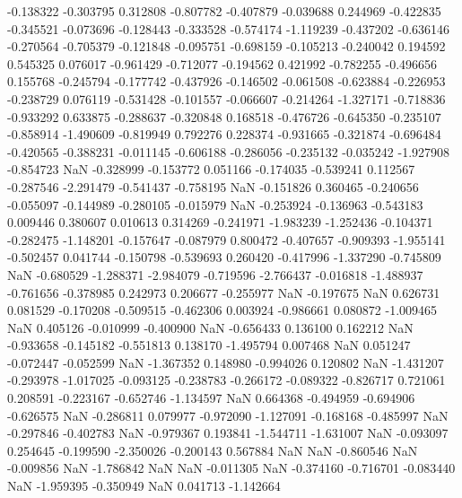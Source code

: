 -0.138322
-0.303795
0.312808
-0.807782
-0.407879
-0.039688
0.244969
-0.422835
-0.345521
-0.073696
-0.128443
-0.333528
-0.574174
-1.119239
-0.437202
-0.636146
-0.270564
-0.705379
-0.121848
-0.095751
-0.698159
-0.105213
-0.240042
0.194592
0.545325
0.076017
-0.961429
-0.712077
-0.194562
0.421992
-0.782255
-0.496656
0.155768
-0.245794
-0.177742
-0.437926
-0.146502
-0.061508
-0.623884
-0.226953
-0.238729
0.076119
-0.531428
-0.101557
-0.066607
-0.214264
-1.327171
-0.718836
-0.933292
0.633875
-0.288637
-0.320848
0.168518
-0.476726
-0.645350
-0.235107
-0.858914
-1.490609
-0.819949
0.792276
0.228374
-0.931665
-0.321874
-0.696484
-0.420565
-0.388231
-0.011145
-0.606188
-0.286056
-0.235132
-0.035242
-1.927908
-0.854723
NaN
-0.328999
-0.153772
0.051166
-0.174035
-0.539241
0.112567
-0.287546
-2.291479
-0.541437
-0.758195
NaN
-0.151826
0.360465
-0.240656
-0.055097
-0.144989
-0.280105
-0.015979
NaN
-0.253924
-0.136963
-0.543183
0.009446
0.380607
0.010613
0.314269
-0.241971
-1.983239
-1.252436
-0.104371
-0.282475
-1.148201
-0.157647
-0.087979
0.800472
-0.407657
-0.909393
-1.955141
-0.502457
0.041744
-0.150798
-0.539693
0.260420
-0.417996
-1.337290
-0.745809
NaN
-0.680529
-1.288371
-2.984079
-0.719596
-2.766437
-0.016818
-1.488937
-0.761656
-0.378985
0.242973
0.206677
-0.255977
NaN
-0.197675
NaN
0.626731
0.081529
-0.170208
-0.509515
-0.462306
0.003924
-0.986661
0.080872
-1.009465
NaN
0.405126
-0.010999
-0.400900
NaN
-0.656433
0.136100
0.162212
NaN
-0.933658
-0.145182
-0.551813
0.138170
-1.495794
0.007468
NaN
0.051247
-0.072447
-0.052599
NaN
-1.367352
0.148980
-0.994026
0.120802
NaN
-1.431207
-0.293978
-1.017025
-0.093125
-0.238783
-0.266172
-0.089322
-0.826717
0.721061
0.208591
-0.223167
-0.652746
-1.134597
NaN
0.664368
-0.494959
-0.694906
-0.626575
NaN
-0.286811
0.079977
-0.972090
-1.127091
-0.168168
-0.485997
NaN
-0.297846
-0.402783
NaN
-0.979367
0.193841
-1.544711
-1.631007
NaN
-0.093097
0.254645
-0.199590
-2.350026
-0.200143
0.567884
NaN
NaN
-0.860546
NaN
-0.009856
NaN
-1.786842
NaN
NaN
-0.011305
NaN
-0.374160
-0.716701
-0.083440
NaN
-1.959395
-0.350949
NaN
0.041713
-1.142664
